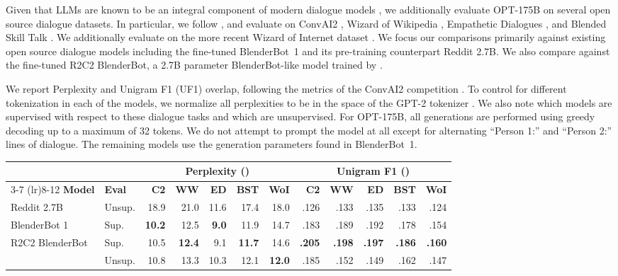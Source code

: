 \documentclass[11pt]{article}
\newcommand{\tablewhitespace}{\addlinespace[0.3em]}
\newcommand{\OPT}[0]{{OPT-175B}}
\begin{document}
Given that LLMs are known to be an integral component of modern dialogue models \cite{adiwardana2020meena,roller-etal-2021-recipes,thoppilan2022lamda,gopher2022,palm2022}, we additionally evaluate \OPT{} on several open source dialogue datasets. In particular, we follow \citet{roller-etal-2021-recipes}, and evaluate on ConvAI2 \cite{dinan2019second}, Wizard of Wikipedia \cite{dinan2018wizard}, Empathetic Dialogues \cite{rashkin2019empathetic}, and Blended Skill Talk \cite{smith2020bst}. We additionally evaluate on the more recent Wizard of Internet dataset \cite{komeili2021woi}.
We focus our comparisons primarily against existing open source dialogue models including the fine-tuned BlenderBot~1 \cite{roller-etal-2021-recipes} and its pre-training counterpart Reddit 2.7B. We also compare against the fine-tuned R2C2 BlenderBot, a 2.7B parameter BlenderBot-like model trained by \citet{shuster2022language}.

We report Perplexity and Unigram F1 (UF1) overlap, following the metrics of the ConvAI2 competition \cite{dinan2019second}. To control for different tokenization in each of the models, we normalize all perplexities to be in the space of the GPT-2 tokenizer \cite{radford2019language}. We also note which models are supervised with respect to these dialogue tasks and which are unsupervised. For \OPT{}, all generations are performed using greedy decoding up to a maximum of 32 tokens. We do not attempt to prompt the model at all except for alternating ``Person 1:'' and ``Person 2:'' lines of dialogue. The remaining models use the generation parameters found in BlenderBot~1.

\begin{table*}[t]
    \centering
    \begin{tabular}{llrrrrrrrrrr}
    \toprule
    & & \multicolumn{5}{c}{Perplexity ()} & \multicolumn{5}{c}{Unigram F1 ()}\\
    \cmidrule(lr){3-7} \cmidrule(lr){8-12}
    {\bf Model} & {\bf Eval} & {\bf C2} & {\bf WW} & {\bf ED} & {\bf BST} & {\bf WoI} & {\bf C2} & {\bf WW} & {\bf ED} & {\bf BST} & {\bf WoI}\\
    \midrule
         Reddit 2.7B             & Unsup. &  18.9  &    21.0 & 11.6   & 17.4    & 18.0   & .126 & .133 & .135 & .133 & .124 \\
         BlenderBot 1            & Sup.   &{\bf10.2}  &    12.5 &{\bf9.0}& 11.9    & 14.7   & .183 & .189 & .192 & .178 & .154\\
         R2C2 BlenderBot             & Sup.   &  10.5  &   {\bf 12.4} &  9.1   &{\bf11.7}& 14.6   &{\bf.205}&{\bf.198}&{\bf.197}&{\bf.186}&{\bf.160}\\
         \tablewhitespace
         \OPT                    & Unsup. &  10.8 & 13.3 & 10.3  &  12.1 & {\bf 12.0} & .185 & .152 & .149 & .162 & .147\\
    \bottomrule
    \end{tabular}
    \caption{{\bf Dialogue Evaluations.} OPT-175B, in a fully unsupervised setting, performs competitively against fully supervised models.}
    \label{tab:dialogue_evals}
\end{table*}
\end{document}
